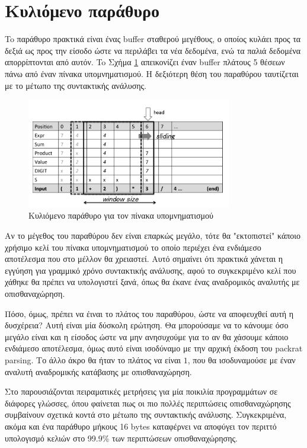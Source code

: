 \section{Κυλιόμενο παράθυρο}

To παράθυρο πρακτικά είναι ένας buffer σταθερού μεγέθους, ο οποίος κυλάει προς τα δεξιά ως προς την είσοδο ώστε να περιλάβει τα νέα δεδομένα, ενώ τα παλιά δεδομένα απορρίπτονται από αυτόν. 
To Σχήμα \ref{fig:slide_window} απεικονίζει έναν buffer πλάτους 5 θέσεων πάνω από έναν πίνακα υπομνηματισμού.
Η δεξιότερη θέση του παραθύρου ταυτίζεται με το μέτωπο της συντακτικής ανάλυσης.

\begin{figure}[h]
	\centering
	\includegraphics[width=0.8\textwidth]{pics/slide_window} %
	\caption{Κυλιόμενο παράθυρο για τον πίνακα υπομνηματισμού}
	\label{fig:slide_window}
\end{figure}

Αν το μέγεθος του παραθύρου δεν είναι επαρκώς μεγάλο, τότε θα "εκτοπιστεί" κάποιο χρήσιμο κελί του πίνακα υπομνηματισμού το οποίο περιέχει ένα ενδιάμεσο αποτέλεσμα που στο μέλλον θα χρειαστεί.
Αυτό σημαίνει ότι πρακτικά χάνεται η εγγύηση για γραμμικό χρόνο συντακτικής ανάλυσης, αφού το συγκεκριμένο κελί που χάθηκε θα πρέπει να υπολογιστεί ξανά, όπως θα έκανε ένας αναδρομικός αναλυτής με οπισθαναχώρηση.

Πόσο, όμως, πρέπει να έιναι το πλάτος του παραθύρου, ώστε να αποφευχθεί αυτή η δυσχέρεια?
Αυτή είναι μία δύσκολη ερώτηση. 
Θα μπορούσαμε να το κάνουμε όσο μεγάλο είναι και η είσοδος ώστε να μην ανησυχούμε για το αν θα χάσουμε κάποιο ενδιάμεσο αποτέλεσμα, όμως αυτό είναι ισοδύναμο με την αρχική έκδοση του packrat parsing.
Το άλλο άκρο θα ήταν το πλάτος να είναι $1$, που θα ισοδυναμούσε με έναν αναλυτή αναδρομικής κατάβασης με οπισθαναχώρηση.

Στο \cite{Kuramitsu2015a} παρουσιάζονται πειραματικές μετρήσεις για μία ποικιλία προγραμμάτων σε διάφορες γλώσσες, όπου φαίνεται πως οι πιο πολλές περιπτώσεις οπισθαναχώρησης συμβαίνουν σχετικά κοντά στο μέτωπο της συντακτικής ανάλυσης.
Συγκεκριμένα, ακόμα και ένα παράθυρο μήκους 16 bytes καταφέρνει να αποφύγει τον περιττό υπολογισμό κελιών στο 99.9\% των περιπτώσεων οπισθαναχώρησης.

